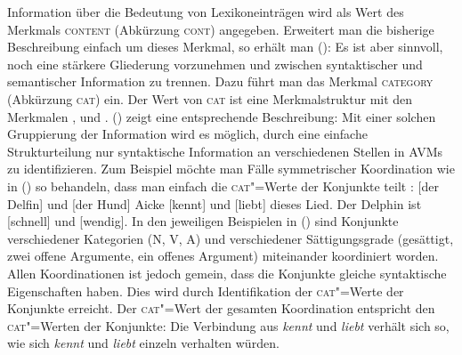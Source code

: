 Information über die Bedeutung von Lexikoneinträgen wird als Wert des Merkmals \textsc{content}
(Abkürzung \textsc{cont}) angegeben. Erweitert man die bisherige Beschreibung einfach
um dieses Merkmal, so erhält man (): 
\ea
\z
Es ist aber sinnvoll, noch eine stärkere Gliederung vorzunehmen und zwischen syntaktischer und semantischer
Information zu trennen. Dazu führt man das Merkmal \textsc{category} (Abkürzung \textsc{cat}) ein. Der Wert
von \textsc{cat} ist eine Merkmalstruktur mit den Merkmalen \head, \spr und \comps. ()
zeigt eine entsprechende Beschreibung:
\ea
\label{geom-cat-cont}
\z
Mit einer solchen Gruppierung der Information wird es möglich, durch eine einfache
Strukturteilung nur syntaktische Information an verschiedenen Stellen in AVMs zu identifizieren. Zum Beispiel möchte
man Fälle symmetrischer\label{page-symmetrische-koordination} Koordination wie in () so behandeln, dass
man einfach die \textsc{cat}"=Werte der Konjunkte teilt \citep[]{ps2}:
\eal
\ex {}[der Delfin] und [der Hund]
\ex Aicke [kennt] und [liebt] dieses Lied.
\ex Der Delphin ist [schnell] und [wendig].
\zl
In den jeweiligen Beispielen in () sind Konjunkte verschiedener Kategorien (N, V, A) und 
verschiedener Sättigungsgrade (gesättigt,
zwei offene Argumente, ein offenes Argument) miteinander
koordiniert worden. Allen Koordinationen ist jedoch gemein, dass die Konjunkte gleiche syntaktische
Eigenschaften haben. Dies wird durch Identifikation der \textsc{cat}"=Werte der Konjunkte erreicht.
Der \textsc{cat}"=Wert der gesamten Koordination entspricht den \textsc{cat}"=Werten der Konjunkte:
Die Verbindung aus \emph{kennt} und \emph{liebt} verhält sich so, wie sich \emph{kennt} und \emph{liebt}
einzeln verhalten würden.

